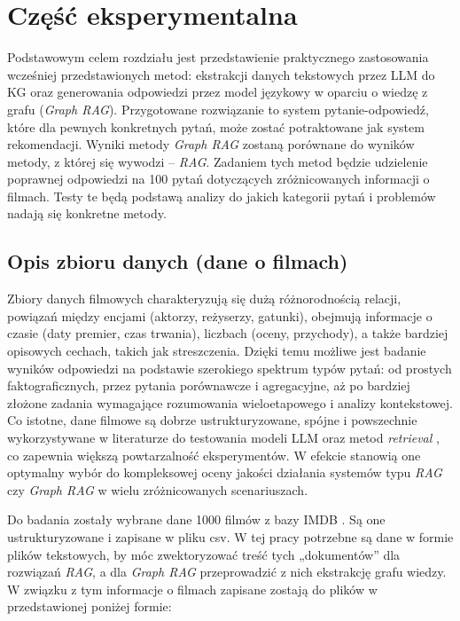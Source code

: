 \documentclass[
a4paper,
12pt,
]{article}
\begin{document}

\newpage

\section{Część eksperymentalna}

Podstawowym celem rozdziału jest przedstawienie praktycznego zastosowania wcześniej przedstawionych metod: ekstrakcji danych tekstowych przez LLM do KG oraz generowania odpowiedzi przez model językowy w oparciu o wiedzę z grafu (\textit{Graph RAG}). 
Przygotowane rozwiązanie to system pytanie-odpowiedź, które dla pewnych konkretnych pytań, może zostać potraktowane jak system rekomendacji.
Wyniki metody \textit{Graph RAG} zostaną porównane do wyników metody, z której się wywodzi -- \textit{RAG}. 
Zadaniem tych metod będzie udzielenie poprawnej odpowiedzi na 100 pytań dotyczących zróżnicowanych informacji o filmach. Testy te będą podstawą analizy do jakich kategorii pytań i problemów nadają się konkretne metody. 


\subsection{Opis zbioru danych (dane o filmach)}

Zbiory danych filmowych charakteryzują się dużą różnorodnością relacji, powiązań między encjami (aktorzy, reżyserzy, gatunki), obejmują informacje o czasie (daty premier, czas trwania), liczbach (oceny, przychody), a także bardziej opisowych cechach, takich jak streszczenia. Dzięki temu możliwe jest badanie wyników odpowiedzi na podstawie szerokiego spektrum typów pytań: od prostych faktograficznych, przez pytania porównawcze i agregacyjne, aż po bardziej złożone zadania wymagające rozumowania wieloetapowego i analizy kontekstowej. Co istotne, dane filmowe są dobrze ustrukturyzowane, spójne i powszechnie wykorzystywane w literaturze do testowania modeli LLM oraz metod \textit{retrieval} \cite{kgllm:movie}, co zapewnia większą powtarzalność eksperymentów. W efekcie stanowią one optymalny wybór do kompleksowej oceny jakości działania systemów typu \textit{RAG} czy \textit{Graph RAG} w wielu zróżnicowanych scenariuszach.

Do badania zostały wybrane dane 1000 filmów z bazy IMDB \cite{imdb:data}. Są one ustrukturyzowane i zapisane w pliku csv. W tej pracy potrzebne są dane w formie plików tekstowych, by móc zwektoryzować treść tych „dokumentów” dla rozwiązań \textit{RAG}, a dla \textit{Graph RAG} przeprowadzić z nich ekstrakcję grafu wiedzy. W związku z tym informacje o filmach zapisane zostają do plików w przedstawionej poniżej formie:
\end{document}
